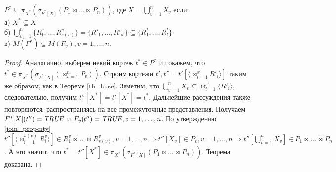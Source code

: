 \author{Мосин Сергей, Зыкин Сергей}
\def \bigcupn {\bigcup\limits_{v=1}^{n}}
\begin{theorem}
$P^{\ast} \subseteq \pi_{X^{\ast}} ( \sigma_{F^{\ast}[X]} (P_1 \Join \dots \Join P_n))$, где $X = \bigcupn X_{v}$ если:
\\а) $X^{\ast} \subseteq X$
\\б)
$ \bigcupn \{R^{v}_{1}, \ldots, R^{v}_{s(v)}\} = \{R'_{1}, \ldots, R'_{s'}\}
\subseteq
\{R^{\ast}_{1}, \ldots, R^{\ast}_{l}\} $
\\в) $M(F^{\ast}) \subseteq M(F_{v}), v = 1,\dots,n $.

\label{th_mult}
\end{theorem}
\begin{proof}
Аналогично, выберем некий кортеж $t^{\ast} \in P^{\ast}$ и покажем, 
что $t^{\ast} \in \pi_{X^{\ast}} ( \sigma_{F^{\ast}[X]} (\Join_{v=1}^{n} P_{v}))$. Строим кортежи
$t', t'' = t'[\langle {\Join}_{i=1}^{s'} R'_i \rangle]$ таким же образом,
как в Теореме \ref{th_base}. Заметим, что $\bigcupn X_{v} \subseteq 
{\Join}_{i=1}^{s'} \langle R'_i \rangle$, следовательно, получим
$t''[X^{\ast}] = t'[X^{\ast}] = t^{\ast}$.
Дальнейшие рассуждения также повторяются, распространяясь на все промежуточные представления. Получаем $F^{\ast} [X] (t'') = \mathit{TRUE}$ и $F_v (t'') = \mathit{TRUE}, v = 1,\dots,n $.
По утверждению \ref{join_property} $t''[\langle \Join_{i=1}^{s(v)} R^v_i \rangle]
\in 
R^v_1 \Join \dots \Join R^v_{s(v)}, v = 1, \dots, n
\Rightarrow   
t''[X_v] \in P_v, v = 1, \dots, n
\Rightarrow
t''[\bigcupn X_{v}] \in P_1 \Join \dots \Join P_n$.
А это значит, что $t^{\ast} = t''[X^{\ast}] \in 
\pi_{X^{\ast}} ( \sigma_{F^{\ast}[X]} (P_1 \Join \dots \Join P_n))$.
Теорема доказана.
\end{proof}
